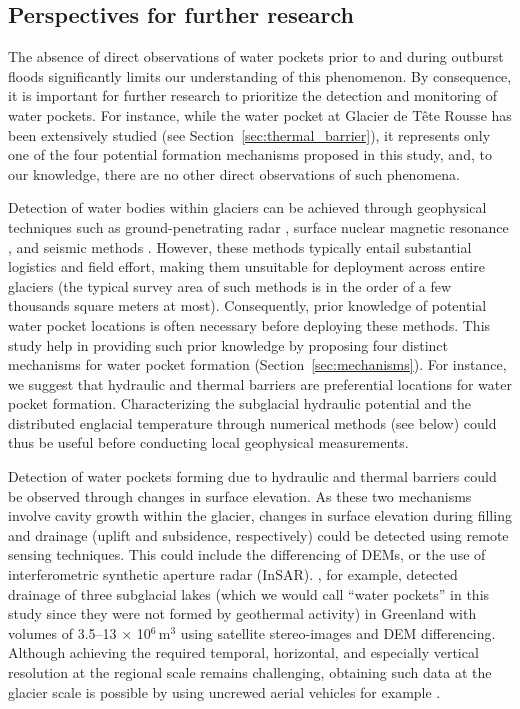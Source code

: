 \subsection{ Perspectives for further research}
\label{sec:wpof_perspectives}

The absence of direct observations of water pockets prior to and during outburst floods significantly limits our understanding of this phenomenon. By consequence, it is important for further research to prioritize the detection and monitoring of water pockets. For instance, while the water pocket at Glacier de Tête Rousse has been extensively studied (see Section~\ref{sec:thermal_barrier}), it represents only one of the four potential formation mechanisms proposed in this study, and, to our knowledge, there are no other direct observations of such phenomena. 

Detection of water bodies within glaciers can be achieved through geophysical techniques such as ground-penetrating radar \citep[e.g.][]{Vincent&al2012,Church&al2021}, surface nuclear magnetic resonance \citep[e.g.][]{Legchenko&2014,Garambois&al2016}, and seismic methods \citep[e.g.][]{Horgan&al2012,Guillemot&al2024}. However, these methods typically entail substantial logistics and field effort, making them unsuitable for deployment across entire glaciers (the typical survey area of such methods is in the order of a few thousands square meters at most). Consequently, prior knowledge of potential water pocket locations is often necessary before deploying these methods. This study help in providing such prior knowledge by proposing four distinct mechanisms for water pocket formation  (Section~\ref{sec:mechanisms}). For instance, we suggest that hydraulic and thermal barriers are preferential locations for water pocket formation. Characterizing the subglacial hydraulic potential and the distributed englacial temperature through numerical methods (see below) could thus be useful before conducting local geophysical measurements.  

Detection of water pockets forming due to hydraulic and thermal barriers could be observed through changes in surface elevation. As these two mechanisms involve cavity growth within the glacier, changes in surface elevation during filling and drainage (uplift and subsidence, respectively) could be detected using remote sensing techniques. This could include the differencing of DEMs, or the use of interferometric synthetic aperture radar (InSAR).  \cite{livingstone&al2019}, for example, detected drainage of three subglacial lakes (which we would call ``water pockets'' in this study since they were not formed by geothermal activity) in Greenland with volumes of 3.5–13$\,\times$\,10$^6$\,m$^3$ using satellite stereo-images and DEM differencing. Although achieving the required temporal, horizontal, and especially vertical resolution at the regional scale remains challenging, obtaining such data at the glacier scale is possible by using uncrewed aerial vehicles for example \citep[e.g.][]{Bhardwaj&al2016,Groos&al2022}.

